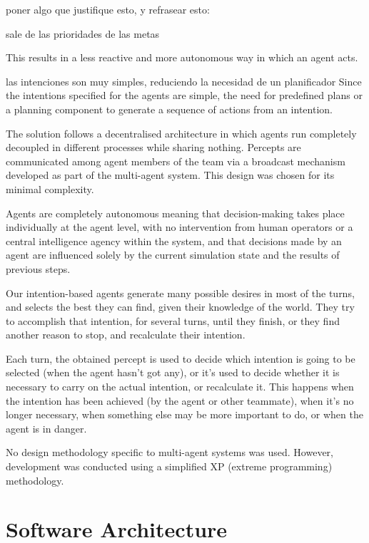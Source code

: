 \documentclass{llncs2e/llncs}
\begin{document}
    poner algo que justifique esto, y refrasear esto:

    sale de las prioridades de las metas

    This results in a less reactive and more autonomous way in which an agent acts.

    las intenciones son muy simples, reduciendo la necesidad de un planificador
    Since the intentions specified for the agents are simple, the need for 
    predefined plans or a planning component to generate a sequence of actions 
    from an intention.

    The solution follows a decentralised architecture in which agents run 
    completely decoupled in different processes while sharing nothing. Percepts 
    are communicated among agent members of the team via a broadcast mechanism 
    developed as part of the multi-agent system. This design was chosen for its 
    minimal complexity.

    Agents are completely autonomous meaning that decision-making takes place 
    individually at the agent level, with no intervention from human operators or 
    a central intelligence agency within the system, and that decisions made by an 
    agent are influenced solely by the current simulation state and the results of 
    previous steps.

    Our intention-based agents generate many possible desires in most of the 
    turns, and selects the best they can find, given their knowledge of the world. 
    They try to accomplish that intention, for several turns, until they finish, 
    or they find another reason to stop, and recalculate their intention.

    Each turn, the obtained percept is used to decide which intention is going to 
    be selected (when the agent hasn't got any), or it's used to decide whether it 
    is necessary to carry on the actual intention, or recalculate it. This happens 
    when the intention has been achieved (by the agent or other teammate), when 
    it's no longer necessary, when something else may be more important to do, or 
    when the agent is in danger.

    No design methodology specific to multi-agent systems was used. However, 
    development was conducted using a simplified XP (extreme programming) 
    methodology.

\section{Software Architecture}
\end{document}
